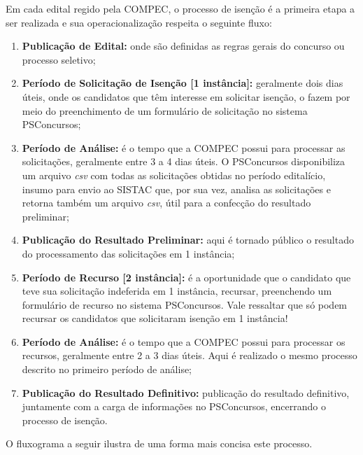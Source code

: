 \documentclass[
	12pt,			%
	openright,		%
	oneside,	
	a4paper,		%
	english,		%
	brazil			%
]{abntex2/abntex2}  %
\begin{document}
			Em cada edital regido pela COMPEC, o processo de isenção é a primeira etapa a ser realizada e sua operacionalização respeita o seguinte fluxo:
			
			\begin{enumerate}
				
				\item \textbf{Publicação de Edital:} onde são definidas as regras gerais do concurso ou processo seletivo;
				\item \textbf{Período de Solicitação de Isenção [1{\textordfeminine} instância]:} geralmente dois dias úteis, onde os candidatos que têm interesse em solicitar isenção, o fazem por meio do preenchimento de um formulário de solicitação no sistema PSConcursos;
				\item \textbf{Período de Análise:} é o tempo que a COMPEC possui para processar as solicitações, geralmente entre 3 a 4 dias úteis. O PSConcursos disponibiliza um arquivo \textit{csv} com todas as solicitações obtidas no período editalício, insumo para envio ao SISTAC que, por sua vez, analisa as solicitações e retorna também um arquivo \textit{csv}, útil para a confecção do resultado preliminar;
				\item \textbf{Publicação do Resultado Preliminar:} aqui é tornado público o resultado do processamento das solicitações em 1{\textordfeminine} instância;
				\item \textbf{Período de Recurso [2{\textordfeminine} instância]:} é a oportunidade que o candidato que teve sua solicitação indeferida em 1{\textordfeminine} instância, recursar, preenchendo um formulário de recurso no sistema PSConcursos. Vale ressaltar que só podem recursar os candidatos que solicitaram isenção em 1{\textordfeminine} instância!
				\item \textbf{Período de Análise:} é o tempo que a COMPEC possui para processar os recursos, geralmente entre 2 a 3 dias úteis. Aqui é realizado o mesmo processo descrito no primeiro período de análise;
				\item \textbf{Publicação do Resultado Definitivo:} publicação do resultado definitivo, juntamente com a carga de informações no PSConcursos, encerrando o processo de isenção.
				
			\end{enumerate}
			
			O fluxograma a seguir ilustra de uma forma mais concisa este processo.
			
\end{document}
